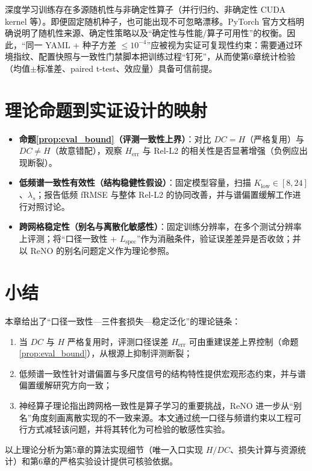 深度学习训练存在多源随机性与非确定性算子（并行归约、非确定性 CUDA kernel 等）。即便固定随机种子，也可能出现不可忽略漂移。PyTorch 官方文档明确说明了随机性来源、确定性策略以及“确定性与性能/算子可用性”的权衡\cite{pytorch_randomness}。因此，“同一 YAML + 种子方差 $\le 10^{-4}$”应被视为实证可复现性约束：需要通过环境指纹、配置快照与一致性门禁脚本把训练过程“钉死”，从而使第6章统计检验（均值$\pm$标准差、paired t-test、效应量）具备可信前提。

\section{理论命题到实证设计的映射}\label{sec:theory_to_exp}

\begin{itemize}
  \item \textbf{命题\ref{prop:eval_bound}（评测一致性上界）}：对比 $DC=H$（严格复用）与 $DC\neq H$（故意错配），观察 $H_{\text{err}}$ 与 Rel-L2 的相关性是否显著增强（负例应出现断裂）。
  \item \textbf{低频谱一致性有效性（结构稳健性假设）}：固定模型容量，扫描 $K_{\text{low}}\in[8,24]$、$\lambda_s$；报告低频 fRMSE 与整体 Rel-L2 的协同改善，并与谱偏置缓解工作进行对照讨论\cite{liu2025diminishing_spectral_bias,wang2025spectralbias_multiscale}。
  \item \textbf{跨网格稳定性（别名与离散化敏感性）}：固定训练分辨率，在多个测试分辨率上评测；将“口径一致性 + $L_{\text{spec}}$”作为消融条件，验证误差差异是否收敛；并以 ReNO 的别名问题定义作为理论参照\cite{bartolucci2023reno}。
\end{itemize}

\section{小结}\label{sec:theory_summary}

本章给出了“口径一致性—三件套损失—稳定泛化”的理论链条：
\begin{enumerate}[label=(\arabic*)]
  \item 当 $DC$ 与 $H$ 严格复用时，评测口径误差 $H_{\text{err}}$ 可由重建误差上界控制（命题\ref{prop:eval_bound}），从根源上抑制评测断裂；
  \item 低频谱一致性针对谱偏置与多尺度信号的结构特性提供宏观形态约束，并与谱偏置缓解研究方向一致\cite{liu2025diminishing_spectral_bias,wang2025spectralbias_multiscale}；
  \item 神经算子理论指出跨网格一致性是算子学习的重要挑战\cite{kovachki2023neural_operator}，ReNO 进一步从“别名”角度刻画离散实现的不一致来源\cite{bartolucci2023reno}。本文通过统一口径与频谱约束以工程可行方式减轻该问题，并将其转化为可检验的敏感性实验。
\end{enumerate}

以上理论分析为第5章的算法实现细节（唯一入口实现 $H/DC$、损失计算与资源统计）和第6章的严格实验设计提供可核验依据。
